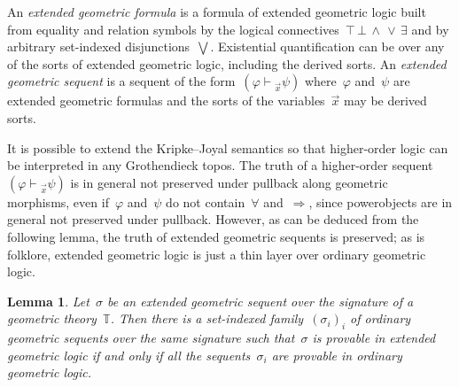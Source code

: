 \documentclass[oneside,reqno]{amsart}
\theoremstyle{definition}
\theoremstyle{plain}
\newtheorem{lemma}[defn]{Lemma}
\theoremstyle{remark}
\newcommand{\TT}{\mathbb{T}}
\renewcommand{\_}{\mathpunct{.}\,}
\newcommand{\?}{\,{:}\,}
\newcommand{\seq}[1]{\mathrel{\vdash\!\!\!_{#1}}}
\begin{document}
An \emph{extended geometric formula} is a formula of extended geometric logic built from equality and
relation symbols by the logical
connectives~${\top}\,{\bot}\,{\wedge}\,{\vee}\,{\exists}$
and by arbitrary set-indexed disjunctions~$\bigvee$. Existential
quantification can be over any of the sorts of extended geometric logic, including the derived sorts. An
\emph{extended geometric sequent} is a sequent of the form~$(\varphi
\seq{\vec x} \psi)$ where~$\varphi$ and~$\psi$ are extended geometric
formulas and the sorts of the variables~$\vec x$ may be derived sorts.

It is possible to extend the Kripke--Joyal semantics so that higher-order logic
can be interpreted in any Grothendieck topos. The truth of a higher-order
sequent~$(\varphi \seq{\vec x} \psi)$ is in general not preserved under
pullback along geometric morphisms, even if~$\varphi$ and~$\psi$ do not
contain~${\forall}$ and~$\Rightarrow$, since powerobjects are in general not
preserved under pullback. However, as can be deduced from the following lemma,
the truth of extended geometric sequents is preserved; as is folklore, extended
geometric logic is just a thin layer over ordinary geometric logic.

\begin{lemma}\label{lemma:extended-conservative}
Let~$\sigma$ be an extended geometric sequent over the signature
of a geometric theory~$\TT$. Then there is a set-indexed family~$(\sigma_i)_i$ of ordinary
geometric sequents over the same signature such that~$\sigma$ is provable in
extended geometric logic if and only if all the sequents~$\sigma_i$ are
provable in ordinary geometric logic.\end{lemma}
\end{document}
